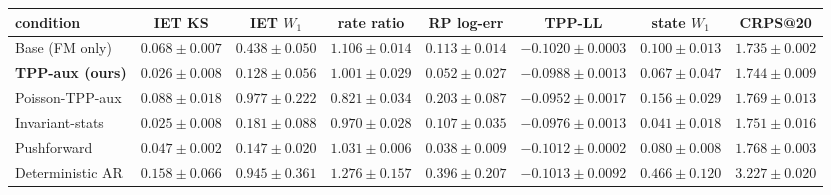 \begin{tabular}{lccccccc}
\toprule
condition & IET KS & IET $W_1$ & rate ratio & RP log-err & TPP-LL & state $W_1$ & CRPS@20 \\
\midrule
Base (FM only) & $0.068 \pm 0.007$ & $0.438 \pm 0.050$ & $1.106 \pm 0.014$ & $0.113 \pm 0.014$ & $-0.1020 \pm 0.0003$ & $0.100 \pm 0.013$ & $\mathbf{1.735 \pm 0.002}$ \\
\textbf{TPP-aux (ours)} & $0.026 \pm 0.008$ & $\mathbf{0.128 \pm 0.056}$ & $\mathbf{1.001 \pm 0.029}$ & $0.052 \pm 0.027$ & $-0.0988 \pm 0.0013$ & $0.067 \pm 0.047$ & $1.744 \pm 0.009$ \\
Poisson-TPP-aux & $0.088 \pm 0.018$ & $0.977 \pm 0.222$ & $0.821 \pm 0.034$ & $0.203 \pm 0.087$ & $\mathbf{-0.0952 \pm 0.0017}$ & $0.156 \pm 0.029$ & $1.769 \pm 0.013$ \\
Invariant-stats & $\mathbf{0.025 \pm 0.008}$ & $0.181 \pm 0.088$ & $0.970 \pm 0.028$ & $0.107 \pm 0.035$ & $-0.0976 \pm 0.0013$ & $\mathbf{0.041 \pm 0.018}$ & $1.751 \pm 0.016$ \\
Pushforward & $0.047 \pm 0.002$ & $0.147 \pm 0.020$ & $1.031 \pm 0.006$ & $\mathbf{0.038 \pm 0.009}$ & $-0.1012 \pm 0.0002$ & $0.080 \pm 0.008$ & $1.768 \pm 0.003$ \\
Deterministic AR & $0.158 \pm 0.066$ & $0.945 \pm 0.361$ & $1.276 \pm 0.157$ & $0.396 \pm 0.207$ & $-0.1013 \pm 0.0092$ & $0.466 \pm 0.120$ & $3.227 \pm 0.020$ \\
\bottomrule
\end{tabular}